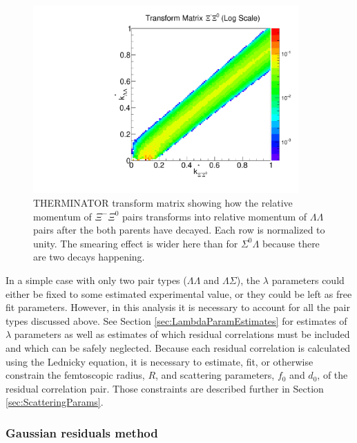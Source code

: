 \begin{figure}[hbtp]
\begin{center}
\includegraphics[width=24pc]{Figures/TransformMatrices/2016-7-20-TransformMatrixXiCXi0NormLog.pdf}
\end{center}
\caption[Transform matrix for $k^*_{\Xi^-\Xi^0} \rightarrow k^*_{\Lambda\Lambda}$]{THERMINATOR \cite{Chojnacki:2011hb} transform matrix showing how the relative momentum of $\Xi^-\Xi^0$ pairs transforms into relative momentum of $\Lambda\Lambda$ pairs after the both parents have decayed. Each row is normalized to unity. The smearing effect is wider here than for $\Sigma^0\Lambda$ because there are two decays happening.}
\label{fig:TherminatorXcX0}
\end{figure}

In a simple case with only two pair types ($\Lambda\Lambda$ and $\Lambda\Sigma$), the $\lambda$ parameters could either be fixed to some estimated experimental value, or they could be left as free fit parameters.
However, in this analysis it is necessary to account for all the pair types discussed above.
See Section \ref{sec:LambdaParamEstimates} for estimates of $\lambda$ parameters as well as estimates of which residual correlations must be included and which can be safely neglected.  
Because each residual correlation is calculated using the Lednicky equation, it is necessary to estimate, fit, or otherwise constrain the femtoscopic radius, $R$, and scattering parameters, $f_0$ and $d_0$, of the residual correlation pair.
Those constraints are described further in Section \ref{sec:ScatteringParams}.

\subsubsection{Gaussian residuals method}
\label{sec:GaussianResiduals}

